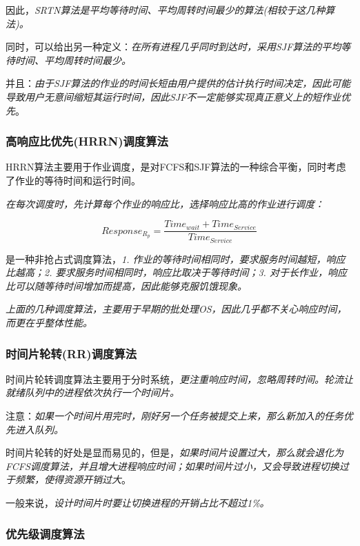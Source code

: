     因此，\emph{SRTN算法是平均等待时间、平均周转时间最少的算法(相较于这几种算法)。}

    同时，可以给出另一种定义：\emph{\color{red}在所有进程几乎同时到达时，采用SJF算法的平均等待时间、平均周转时间最少。}

    并且：\emph{由于SJF算法的作业的时间长短由用户提供的估计执行时间决定，因此可能导致用户无意间缩短其运行时间，因此\color{red}SJF不一定能够实现真正意义上的短作业优先}。

\subsubsection{高响应比优先(HRRN)调度算法}

    HRRN算法主要用于作业调度，是对FCFS和SJF算法的一种综合平衡，同时考虑了作业的等待时间和运行时间。

    \emph{在每次调度时，先计算每个作业的响应比，选择响应比高的作业进行调度：}

$$
    Response_{R_p} = \frac{Time_{wait} + Time_{Service}}{Time_{Service}}
$$

    是一种非抢占式调度算法，\emph{1. 作业的等待时间相同时，要求服务时间越短，响应比越高；2. 要求服务时间相同时，响应比取决于等待时间；3. 对于长作业，响应比可以随等待时间增加而提高，因此能够克服饥饿现象。}

    \emph{上面的几种调度算法，主要用于早期的批处理OS，因此几乎都不关心响应时间，而更在乎整体性能。}

\subsubsection{时间片轮转(RR)调度算法}

    时间片轮转调度算法主要用于分时系统，\emph{更注重响应时间，忽略周转时间。轮流让就绪队列中的进程依次执行一个时间片。}

    注意：\emph{\color{red}如果一个时间片用完时，刚好另一个任务被提交上来，那么新加入的任务优先进入队列。}

    时间片轮转的好处是显而易见的，但是，\emph{如果时间片设置过大，那么就会退化为FCFS调度算法，并且增大进程响应时间；如果时间片过小，又会导致进程切换过于频繁，使得资源开销过大}。

    一般来说，\emph{\color{red}设计时间片时要让切换进程的开销占比不超过1\%。}

\subsubsection{优先级调度算法}

